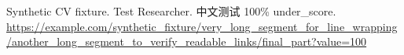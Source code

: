 \documentclass{article}
\begin{document}
Synthetic CV fixture. Test Researcher. 中文测试 100\% under\_score.
\url{https://example.com/synthetic_fixture/very_long_segment_for_line_wrapping/another_long_segment_to_verify_readable_links/final_part?value=100}
\end{document}
